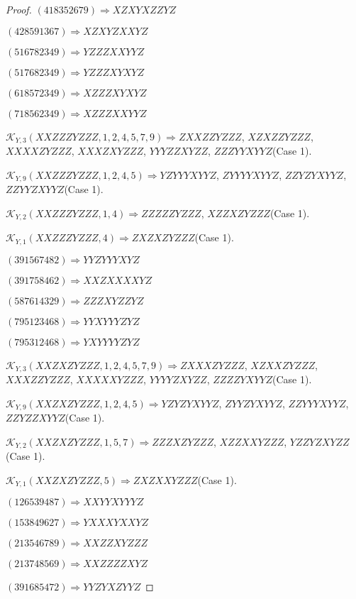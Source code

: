 \documentclass[12pt]{article}
\theoremstyle{plain}
\theoremstyle{definition}
\theoremstyle{remark}
\newcommand{\fancy}[1]{\mathcal{#1}}
\def\K{\fancy{K}}
\begin{document}
\begin{proof}
	$(4 1 8 3 5 2 6 7 9)\Rightarrow XZXYXZZYZ$
	
	$(4 2 8 5 9 1 3 6 7)\Rightarrow XZXYZXXYZ$
	
	$(5 1 6 7 8 2 3 4 9)\Rightarrow YZZZXXYYZ$
	
	$(5 1 7 6 8 2 3 4 9)\Rightarrow YZZZXYXYZ$
	
	$(6 1 8 5 7 2 3 4 9)\Rightarrow XZZZXYXYZ$
	
	$(7 1 8 5 6 2 3 4 9)\Rightarrow XZZZXXYYZ$
	
	
	
	$\K_{Y,3}(XXZZZYZZZ,1, 2, 4, 5, 7, 9)\Rightarrow $$ZXXZZYZZZ$, $XZXZZYZZZ$, $XXXXZYZZZ$, $XXXZXYZZZ$, $YYYZZXYZZ$, $ZZZYYXYYZ$(Case 1).
	
	$\K_{Y,9}(XXZZZYZZZ,1, 2, 4, 5)\Rightarrow $$YZYYYXYYZ$, $ZYYYYXYYZ$, $ZZYZYXYYZ$, $ZZYYZXYYZ$(Case 1).
	
	$\K_{Y,2}(XXZZZYZZZ,1, 4)\Rightarrow $$ZZZZZYZZZ$, $XZZXZYZZZ$(Case 1).
	
	$\K_{Y,1}(XXZZZYZZZ,4)\Rightarrow $$ZXZXZYZZZ$(Case 1).
	
	
	
	$(3 9 1 5 6 7 4 8 2)\Rightarrow YYZYYYXYZ$
	
	$(3 9 1 7 5 8 4 6 2)\Rightarrow XXZXXXXYZ$
	
	$(5 8 7 6 1 4 3 2 9)\Rightarrow ZZZXYZZYZ$
	
	$(7 9 5 1 2 3 4 6 8)\Rightarrow YYXYYYZYZ$
	
	$(7 9 5 3 1 2 4 6 8)\Rightarrow YXYYYYZYZ$
	
	
	
	$\K_{Y,3}(XXZXZYZZZ,1, 2, 4, 5, 7, 9)\Rightarrow $$ZXXXZYZZZ$, $XZXXZYZZZ$, $XXXZZYZZZ$, $XXXXXYZZZ$, $YYYYZXYZZ$, $ZZZZYXYYZ$(Case 1).
	
	$\K_{Y,9}(XXZXZYZZZ,1, 2, 4, 5)\Rightarrow $$YZYZYXYYZ$, $ZYYZYXYYZ$, $ZZYYYXYYZ$, $ZZYZZXYYZ$(Case 1).
	
	$\K_{Y,2}(XXZXZYZZZ,1, 5, 7)\Rightarrow $$ZZZXZYZZZ$, $XZZXXYZZZ$, $YZZYZXYZZ$(Case 1).
	
	$\K_{Y,1}(XXZXZYZZZ,5)\Rightarrow $$ZXZXXYZZZ$(Case 1).
	
	
	
	$(1 2 6 5 3 9 4 8 7)\Rightarrow XXYYXYYYZ$
	
	$(1 5 3 8 4 9 6 2 7)\Rightarrow YXXXYXXYZ$
	
	$(2 1 3 5 4 6 7 8 9)\Rightarrow XXZZXYZZZ$
	
	$(2 1 3 7 4 8 5 6 9)\Rightarrow XXZZZZXYZ$
	
	$(3 9 1 6 8 5 4 7 2)\Rightarrow YYZYXZYYZ$
	

\end{proof}
\end{document}
